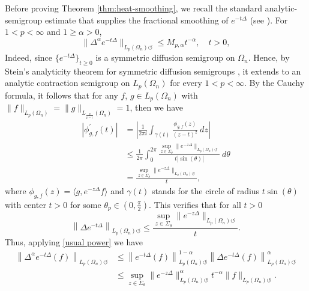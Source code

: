 \documentclass{amsart}
\numberwithin{equation}{section}
\theoremstyle{definition}
\theoremstyle{remark}
\newcommand{\1}{\mathbf 1}
\begin{document}
Before proving Theorem \ref{thm:heat-smoothing}, we recall the standard analytic-semigroup estimate that supplies the fractional smoothing of $e^{-t\Delta}$ (see \cite{CarbonaroDragicevic,Cowling1983}). For $1<p<\infty$ and $1\geq \alpha>0$,
\begin{equation}\label{eq:semigroup-functional-calculus}
\|\Delta^{\alpha}e^{-t\Delta}\|_{L_p(\Omega_{n})\circlearrowleft}
 \leq M_{p,\alpha}t^{-\alpha},\quad t>0,
\end{equation}
Indeed, since $\{e^{-t\Delta}\}_{t\geq 0}$ is a symmetric diffusion semigroup on $\Omega_{n}$. Hence, by Stein's analyticity theorem for symmetric diffusion semigroups \cite[Chapter~III, \S2, Theorem 1, p. 67]{Stein1970}, it extends to an analytic contraction semigroup on $L_{p}(\Omega_{n})$ for every $1<p<\infty$. By the Cauchy formula, it follows that for any $f$, $g\in L_{p}(\Omega_n)$ with $\|f\|_{L_{p}(\Omega_{n})}=\|g\|_{L_{\frac{p}{p-1}}(\Omega_{n})}=1$, then we have
\begin{align*}
\left|\phi_{g,f}^{\prime}(t)\right|&=\left|\frac{1}{2\pi i}\int_{\gamma(t)}\frac{\phi_{g,f}(z)}{(z-t)^{2}}~dz\right|\\
&\leq \frac{1}{2\pi}\int_{0}^{2\pi}\frac{\sup_{z\in \Sigma_{\theta}}\|e^{-z\Delta}\|_{L_{p}(\Omega_{n})\circlearrowleft}}{t|\sin(\theta)|}~d\theta\\
&=\frac{\sup_{z\in \Sigma_{\theta}}\|e^{-z\Delta}\|_{L_{p}(\Omega_{n})\circlearrowleft}}{t},
\end{align*}
where $\phi_{g,f}(z)=\langle g, e^{-z\Delta}f\rangle$ and $\gamma(t)$ stands for the circle of radius $t\sin(\theta)$ with center $t>0$ for some $\theta_{p}\in (0,\frac{\pi}{2})$. This verifies that for all $t>0$
\begin{equation}\label{usual power}
\left\|\Delta e^{-t\Delta}\right\|_{L_{p}(\Omega_{n})\circlearrowleft}\leq \frac{\sup_{z\in \Sigma_{\theta}}\|e^{-z\Delta}\|_{L_{p}(\Omega_{n})\circlearrowleft}}{t}.
\end{equation}
Thus, applying \eqref{usual power} we have
\begin{align*}
\left\|\Delta^{\alpha}e^{-t\Delta}(f)\right\|_{L_{p}(\Omega_{n})\circlearrowleft}&\leq \left\|e^{-t\Delta}(f)\right\|^{1-\alpha}_{L_{p}(\Omega_{n})\circlearrowleft}\left\|\Delta e^{-t\Delta}(f)\right\|^{\alpha}_{L_{p}(\Omega_{n})\circlearrowleft}\\
&\leq \sup_{z\in \Sigma_{\theta}}\|e^{-z\Delta}\|_{L_{p}(\Omega_{n})\circlearrowleft}^{\alpha}t^{-\alpha}\|f\|_{L_{p}(\Omega_{n})\circlearrowleft}.
\end{align*}
\end{document}
